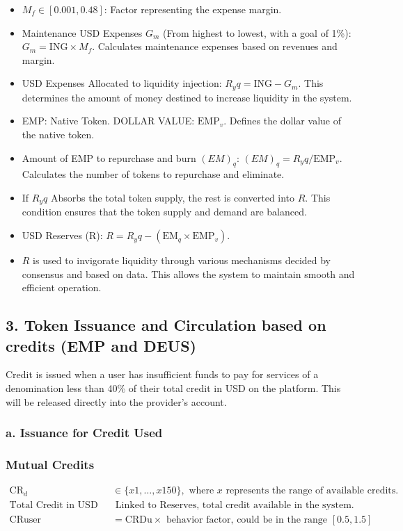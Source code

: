 \documentclass{article}
\begin{document}
\begin{itemize}
    \item \( M_f \in [0.001, 0.48] \): Factor representing the expense margin.
    \item Maintenance USD Expenses \( G_m \) (From highest to lowest, with a goal of 1\%): \( G_m = \text{ING} \times M_f \). Calculates maintenance expenses based on revenues and margin.
    \item USD Expenses Allocated to liquidity injection: \( R_yq = \text{ING} - G_m \). This determines the amount of money destined to increase liquidity in the system.
    \item EMP: Native Token. DOLLAR VALUE: \( \text{EMP}_v \). Defines the dollar value of the native token.
    \item Amount of EMP to repurchase and burn \( (EM)_q \): \( (EM)_q = R_yq / \text{EMP}_v \). Calculates the number of tokens to repurchase and eliminate.
    \item If \( R_yq \) Absorbs the total token supply, the rest is converted into \( R \). This condition ensures that the token supply and demand are balanced.
    \item USD Reserves (R): \( R = R_yq - (\text{EM}_q \times \text{EMP}_v) \).
    \item \( R \) is used to invigorate liquidity through various mechanisms decided by consensus and based on data. This allows the system to maintain smooth and efficient operation.
\end{itemize}

\subsection*{3. Token Issuance and Circulation based on credits (EMP and DEUS)}
Credit is issued when a user has insufficient funds to pay for services of a denomination less than 40\% of their total credit in USD on the platform. This will be released directly into the provider's account.

\subsubsection*{a. Issuance for Credit Used}
\subsubsection*{Mutual Credits}
\begin{align*}
    \text{CR}_d & \in \{x1,\ldots,x150\}, \text{ where } x \text{ represents the range of available credits.} \\
    \text{Total Credit in USD (CRDt):} & \text{ Linked to Reserves, total credit available in the system.} \\
    \text{CRuser} & = \text{CRDu} \times \text{ behavior factor, could be in the range } [0.5, 1.5]
\end{align*}
\end{document}
